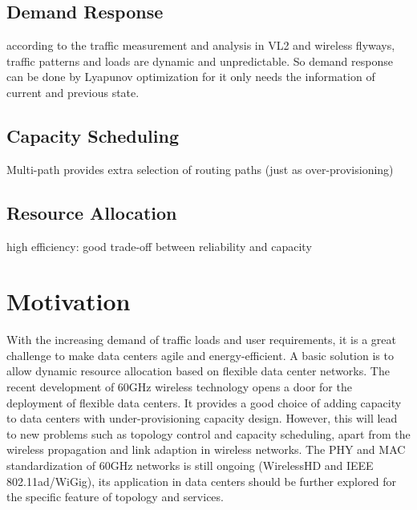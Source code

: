 \documentclass[journal,onecolumn,11pt]{IEEEtran}
\begin{document}
\subsection{Demand Response}

according to the traffic measurement and analysis in VL2 and wireless flyways, traffic patterns and loads are dynamic and unpredictable. So demand response can be done by Lyapunov optimization for it only needs the information of current and previous state.

\subsection{Capacity Scheduling}

Multi-path provides extra selection of routing paths (just as over-provisioning)

\subsection{Resource Allocation}

high efficiency: good trade-off between reliability and capacity

\section{Motivation}

With the increasing demand of traffic loads and user requirements, it is a great challenge to make data centers agile and energy-efficient. A basic solution is to allow dynamic resource allocation based on flexible data center networks. The recent development of 60GHz wireless technology opens a door for the deployment of flexible data centers. It provides a good choice of adding capacity to data centers with under-provisioning capacity design. However, this will lead to new problems such as topology control and capacity scheduling, apart from the wireless propagation and link adaption in wireless networks. The PHY and MAC standardization of 60GHz networks is still ongoing (WirelessHD and IEEE 802.11ad/WiGig), its application in data centers should be further explored for the specific feature of topology and services.
\end{document}
